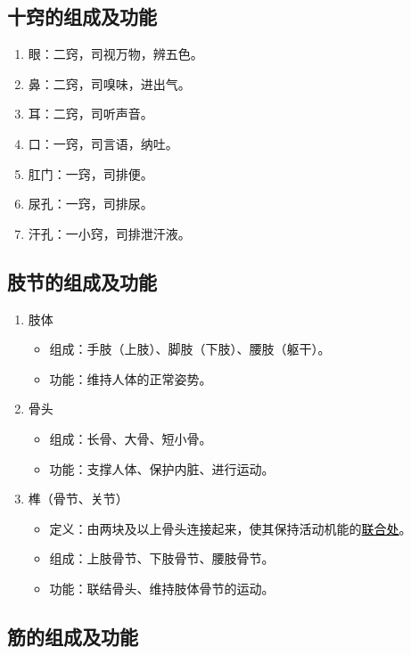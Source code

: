 \documentclass[cn,hazy,black,12pt,normal,founder]{elegantnote}
\newcommand{\redt}[1]{\textcolor{black}{{}#1}}      %
\begin{document}
\subsection{十窍的组成及功能}

\begin{enumerate}
  \item 眼：二窍，司视万物，辨五色。
  \item 鼻：二窍，司嗅味，进出气。
  \item 耳：二窍，司听声音。
  \item 口：一窍，司言语，纳吐。
  \item 肛门：一窍，司排便。
  \item 尿孔：一窍，司排尿。
  \item 汗孔：一小窍，司排泄汗液。
\end{enumerate}

\subsection{肢节的组成及功能}

\begin{enumerate}
  \item 肢体
  \begin{itemize}
    \item 组成：手肢（上肢）、脚肢（下肢）、腰肢（躯干）。
    \item 功能：维持人体的正常姿势。
  \end{itemize}
  \item 骨头
  \begin{itemize}
    \item 组成：长骨、大骨、短小骨。
    \item 功能：支撑人体、保护内脏、进行运动。
  \end{itemize}
  \item 榫（骨节、关节）
  \begin{itemize}
    \item 定义：由两块及以上骨头连接起来，使其保持活动机能的\redt{\uline{联合处}}。
    \item 组成：上肢骨节、下肢骨节、腰肢骨节。
    \item 功能：联结骨头、维持肢体骨节的运动。
  \end{itemize}
\end{enumerate}

\subsection{筋的组成及功能}
\end{document}
